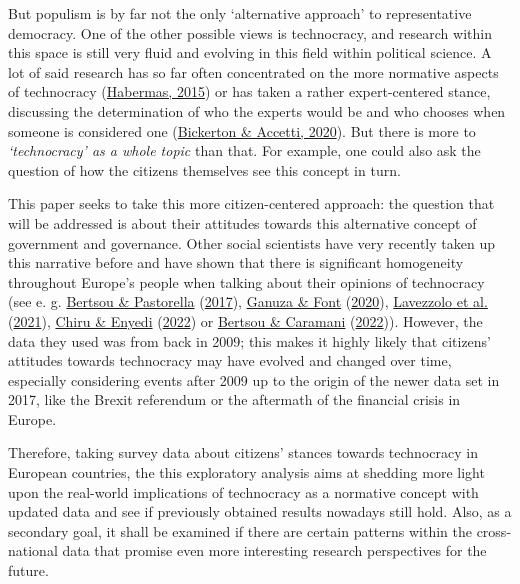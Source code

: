 \documentclass[
  12pt,
  english,
]{article}
\begin{document}
But populism is by far not the only `alternative approach' to
representative democracy. One of the other possible views is
technocracy, and research within this space is still very fluid and
evolving in this field within political science. A lot of said research
has so far often concentrated on the more normative aspects of
technocracy (\protect\hyperlink{ref-habermas2015lure}{Habermas, 2015})
or has taken a rather expert-centered stance, discussing the
determination of who the experts would be and who chooses when someone
is considered one
(\protect\hyperlink{ref-bickerton2020technocracy}{Bickerton \& Accetti,
2020}). But there is more to \emph{`technocracy' as a whole topic} than
that. For example, one could also ask the question of how the citizens
themselves see this concept in turn.

This paper seeks to take this more citizen-centered approach: the
question that will be addressed is about their attitudes towards this
alternative concept of government and governance. Other social
scientists have very recently taken up this narrative before and have
shown that there is significant homogeneity throughout Europe's people
when talking about their opinions of technocracy (see e. g.
\protect\hyperlink{ref-bertsou2017technocratic}{Bertsou \& Pastorella}
(\protect\hyperlink{ref-bertsou2017technocratic}{2017}),
\protect\hyperlink{ref-ganuza2020experts}{Ganuza \& Font}
(\protect\hyperlink{ref-ganuza2020experts}{2020}),
\protect\hyperlink{ref-lavezzolo2021will}{Lavezzolo et al.}
(\protect\hyperlink{ref-lavezzolo2021will}{2021}),
\protect\hyperlink{ref-chiru2022wants}{Chiru \& Enyedi}
(\protect\hyperlink{ref-chiru2022wants}{2022}) or
\protect\hyperlink{ref-bertsou2022people}{Bertsou \& Caramani}
(\protect\hyperlink{ref-bertsou2022people}{2022})). However, the data
they used was from back in 2009; this makes it highly likely that
citizens' attitudes towards technocracy may have evolved and changed
over time, especially considering events after 2009 up to the origin of
the newer data set in 2017, like the Brexit referendum or the aftermath
of the financial crisis in Europe.

Therefore, taking survey data about citizens' stances towards
technocracy in European countries, the this exploratory analysis aims at
shedding more light upon the real-world implications of technocracy as a
normative concept with updated data and see if previously obtained
results nowadays still hold. Also, as a secondary goal, it shall be
examined if there are certain patterns within the cross-national data
that promise even more interesting research perspectives for the future.
\end{document}
